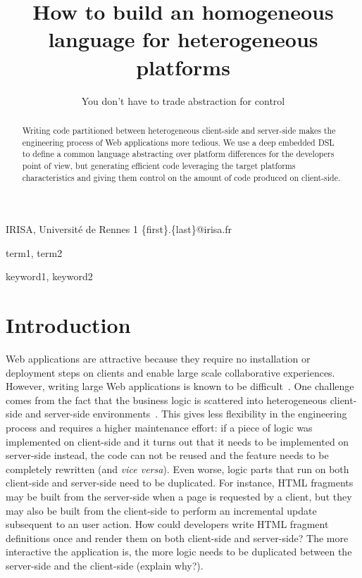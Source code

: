 \documentclass[preprint]{sigplanconf}
\begin{document}
\copyrightdata{[to be supplied]} 


\title{How to build an homogeneous language for heterogeneous platforms}
\subtitle{You don’t have to trade abstraction for control}

           {IRISA, Université de Rennes 1}
           {\{first\}.\{last\}@irisa.fr}

\maketitle

\begin{abstract}
Writing code partitioned between heterogeneous client-side and server-side makes the engineering process of Web
applications more tedious. We use a deep embedded DSL to define a common language abstracting over platform
differences for the developers point of view, but generating efficient code leveraging the target platforms
characteristics and giving them control on the amount of code produced on client-side.
\end{abstract}


\terms
term1, term2

\keywords
keyword1, keyword2

\section{Introduction}

Web applications are attractive because they require no installation or deployment steps on clients and enable large
scale collaborative experiences. However, writing large Web applications is known to be
difficult~\cite{Mikkonen08_SpaghettiJs,Preciado05_RIAMethodologyNecessity}. One challenge comes from the fact
that the business logic is scattered into heterogeneous client-side and server-side
environments~\cite{Echeverria09_RIA,Kuuskeri09_PartitioningClientServer}. This gives less flexibility in the
engineering process and requires a higher maintenance effort: if a piece of logic was implemented on
client-side and it turns out that it needs to be implemented on server-side instead, the code can not be reused and
the feature needs to be completely rewritten (and \emph{vice versa}). Even worse, logic parts that run on both
client-side and server-side need to be duplicated. For instance, HTML fragments may be built from the server-side
when a page is requested by a client, but they may also be built from the client-side to perform an incremental
update subsequent to an user action. How could developers write HTML fragment definitions once and render them on
both client-side and server-side? The more interactive the application is, the more logic needs to be duplicated
between the server-side and the client-side (explain why?).
\end{document}
